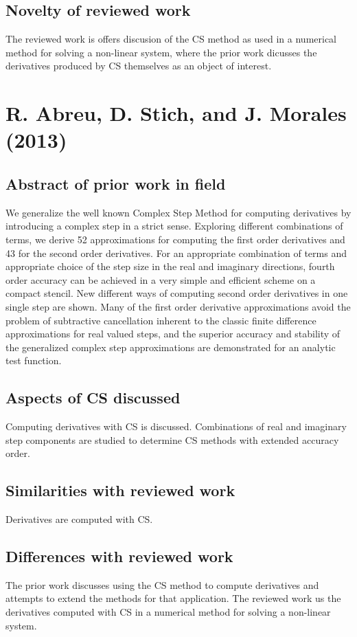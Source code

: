 \documentclass[10pt,letterpaper,draft]{article}
\begin{document}
\subsection{Novelty of reviewed work}
The reviewed work is offers discusion of the CS method as used in a numerical method for solving a non-linear system, where 
the prior work dicusses the derivatives produced by CS themselves as an object of interest.

\section{R. Abreu, D. Stich, and J. Morales (2013)}
\subsection{Abstract of prior work in field}

We generalize the well known Complex Step Method for computing derivatives by
introducing a complex step in a strict sense. Exploring different combinations
of terms, we derive 52 approximations for computing the first order derivatives
and 43 for the second order derivatives. For an appropriate combination of
terms and appropriate choice of the step size in the real and imaginary
directions, fourth order accuracy can be achieved in a very simple and
efficient scheme on a compact stencil. New different ways of computing second
order derivatives in one single step are shown. Many of the first order
derivative approximations avoid the problem of subtractive cancellation
inherent to the classic finite difference approximations for real valued steps,
and the superior accuracy and stability of the generalized complex step
approximations are demonstrated for an analytic test function.

\subsection{Aspects of CS discussed}
Computing derivatives with CS is discussed. Combinations of real and imaginary step components
are studied to determine CS methods with extended accuracy order.

\subsection{Similarities with reviewed work}
Derivatives are computed with CS.

\subsection{Differences with reviewed work}
The prior work discusses using the CS method to compute derivatives and attempts to extend the
methods for that application. The reviewed work us the derivatives computed with CS in a numerical
method for solving a non-linear system.
\end{document}
